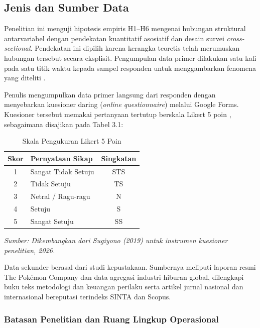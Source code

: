 \documentclass[12pt,a4paper]{article}
\numberwithin{equation}{section}
\numberwithin{table}{section}
\numberwithin{figure}{section}
\begin{document}
\subsection{Jenis dan Sumber Data}

Penelitian ini menguji hipotesis empiris H1--H6 mengenai hubungan struktural antarvariabel dengan pendekatan kuantitatif asosiatif dan desain survei \emph{cross-sectional}. Pendekatan ini dipilih karena kerangka teoretis telah merumuskan hubungan tersebut secara eksplisit. Pengumpulan data primer dilakukan satu kali pada satu titik waktu kepada sampel responden untuk menggambarkan fenomena yang diteliti \citep{sekaran2016research}.

Penulis mengumpulkan data primer langsung dari responden dengan menyebarkan kuesioner daring (\emph{online questionnaire}) melalui Google Forms. Kuesioner tersebut memakai pertanyaan tertutup berskala Likert 5 poin \citep{sugiyono2019metode}, sebagaimana disajikan pada Tabel 3.1:

\begin{table}[H]
\centering
\caption{Skala Pengukuran Likert 5 Poin}
\label{tab:skala_likert}
\begin{tabular}{clc}
\toprule
\textbf{Skor} & \textbf{Pernyataan Sikap} & \textbf{Singkatan} \\
\midrule
1 & Sangat Tidak Setuju & STS \\
2 & Tidak Setuju & TS \\
3 & Netral / Ragu-ragu & N \\
4 & Setuju & S \\
5 & Sangat Setuju & SS \\
\bottomrule
\end{tabular}
\begin{flushleft}
  \footnotesize\textit{Sumber: Dikembangkan dari Sugiyono (2019) untuk instrumen kuesioner penelitian, 2026.}
\end{flushleft}
\end{table}

Data sekunder berasal dari studi kepustakaan. Sumbernya meliputi laporan resmi The Pok\'emon Company dan data agregasi industri hiburan global, dilengkapi buku teks metodologi dan keuangan perilaku serta artikel jurnal nasional dan internasional bereputasi terindeks SINTA dan Scopus.

\subsubsection{Batasan Penelitian dan Ruang Lingkup Operasional}
\end{document}
